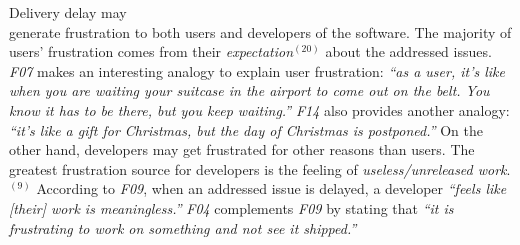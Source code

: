 \begin{sloppypar}
\noindent\DIFdelbegin \textit{\textbf{}%
}%
\DIFdelend \DIFaddbegin {}
\DIFaddend Delivery delay may \DIFaddbegin {}   {\em {}}  \\

\noindent{} \DIFaddend generate
frustration to both users and developers of the software. The majority of users'
frustration comes from their {\em expectation}$^{(20)}$ about the addressed
issues. {\em F07} makes an interesting analogy to explain user frustration: {\em
``as a user, it's like when you are waiting your suitcase in the airport to
come out on the belt. You know it has to be there, but you keep waiting.''}
{\em F14} also provides another analogy: {\em ``it's like a gift for Christmas,
but the day of Christmas is postponed.''} On the other hand, developers may get
frustrated for other reasons than users. The greatest frustration source for
developers is the feeling of {\em useless/unreleased work}.$^{(9)}$ According to
{\em F09}, when an addressed issue is delayed, a developer {\em ``feels like
[their] work is meaningless.''} {\em F04} complements {\em F09} by stating that
{\em ``it is frustrating to work on something and not see it shipped.''} \\


\end{sloppypar}
